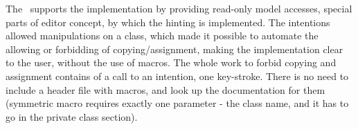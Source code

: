 The \jbmps\ supports the implementation by providing read-only model accesses, special parts of editor concept, 
by which the hinting is implemented. The intentions allowed manipulations on a class, which made it possible to 
automate the allowing or forbidding of copying/assignment, making the implementation clear to the user, without the 
use of macros. The whole work to forbid copying and assignment contains of a call to an intention, one key-stroke.
There is no need to include a header file with macros, and look up the documentation for them (symmetric macro requires
exactly one parameter - the class name, and it has to go in the private class section).








